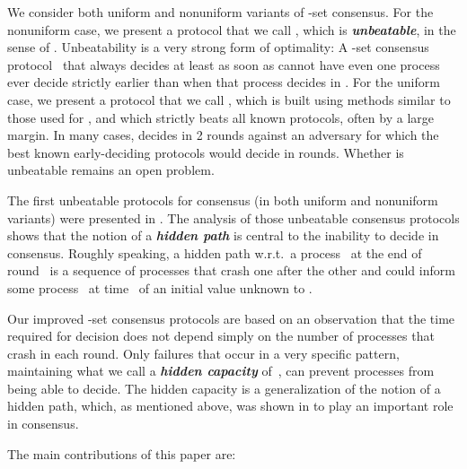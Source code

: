 \documentclass[11pt]{article}
\theoremstyle{definition}
\newcommand{\defemph}[1]{\textbf{\textit{#1}}}
\begin{document}
We consider both uniform and nonuniform variants of -set consensus. For the nonuniform case, we present a protocol
that we call
,
which is \defemph{unbeatable}, in the sense of \cite{AYY-DISC}. Unbeatability is a very strong form of optimality: A -set consensus protocol~ that always decides at least as soon as  cannot have even one process ever
decide
strictly earlier than
when that
process
decides
in .
For the uniform case, we present
a protocol that we call
,
which is built using methods similar to those used for
,
and which
strictly
beats
all known protocols, often by a large margin. In many cases,  decides in 2 rounds against an adversary for which the best known early-deciding protocols would decide in  rounds. Whether  is unbeatable remains an open problem.

The first unbeatable protocols for consensus (in both uniform and nonuniform variants) were presented in \cite{AYY-DISC}.
The analysis of those unbeatable consensus protocols
shows that the notion of a \defemph{hidden path} is central to the inability to decide in consensus.
Roughly speaking,
a hidden path w.r.t.\  a process~ at the end of round~ is a sequence
of processes that crash one after the other and
could inform
some process~
at time~ of an
initial
value
unknown to
.

Our improved -set consensus protocols are based on an observation that the time required for decision does not depend simply on the number of processes that crash in each round. Only failures that occur in a very specific
pattern, maintaining what we call a \defemph{hidden capacity} of~, can prevent processes from being able to decide.
The hidden capacity is a generalization of the notion of a hidden path, which, as mentioned above,
was shown in \cite{AYY-DISC} to play
an important role in consensus.

The main contributions of this paper are:
\end{document}
